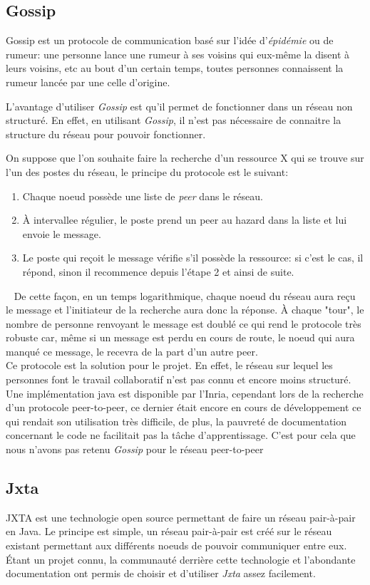 	\subsection{Gossip}
	
		Gossip est un protocole de communication basé sur l'idée
		d'\emph{épidémie} ou de rumeur: une personne lance une rumeur à ses
		voisins qui eux-même la disent à leurs voisins, etc au bout d'un certain
		temps, toutes personnes connaissent la rumeur lancée par une celle
		d'origine.
		
		L'avantage d'utiliser \emph{Gossip} est qu'il permet de fonctionner dans
		un réseau non structuré. En effet, en utilisant \emph{Gossip}, il n'est
		pas nécessaire de connaitre la structure du réseau pour pouvoir
		fonctionner.
		
		On suppose que l'on souhaite faire la recherche d'un ressource X qui se
		trouve sur l'un des postes du réseau, le principe du protocole est le
		suivant:
		\begin{enumerate}
			\item Chaque noeud possède une liste de \emph{peer} dans le réseau.
			\item À intervallee régulier, le poste prend un peer au hazard dans la
			liste et lui envoie le message.
			\item Le poste qui reçoit le message vérifie s'il possède la
			ressource: si c'est le cas, il répond, sinon il recommence depuis
			l'étape 2 et ainsi de suite.
		\end{enumerate}~
		De cette façon, en un temps logarithmique, chaque noeud du réseau aura
		reçu le message et l'initiateur de la recherche aura donc la réponse. À
		chaque "tour", le nombre de personne renvoyant le message est doublé ce
		qui rend le protocole très robuste car, même si un message est perdu en
		cours de route, le noeud qui aura manqué ce message, le recevra de la
		part d'un autre peer.\\
		
		Ce protocole est la solution pour le projet. En effet, le réseau sur
		lequel les personnes font le travail collaboratif n'est pas connu et
		encore moins structuré. Une implémentation java est disponible par
		l'Inria, cependant lors de la recherche d'un protocole peer-to-peer, ce
		dernier était encore en cours de développement ce qui rendait son
		utilisation très difficile, de plus, la pauvreté de documentation
		concernant le code ne facilitait pas la tâche d'apprentissage. C'est
		pour cela que nous n'avons pas retenu \emph{Gossip} pour le réseau
		peer-to-peer
	
	\subsection{Jxta}
		JXTA est une technologie open source permettant de faire un réseau
		pair-à-pair en Java. Le principe est simple, un réseau pair-à-pair est
		créé sur le réseau existant permettant aux différents noeuds de pouvoir
		communiquer entre eux.\\
		
		Étant un projet connu, la communauté derrière cette technologie et
		l'abondante documentation ont permis de choisir et d'utiliser
		\emph{Jxta} assez facilement.
